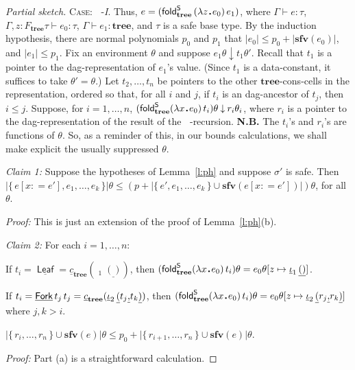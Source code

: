 \documentclass[envcountsame]{llncs}
\newcommand{\sfv}{\ensuremath{\mathbf{sfv}}}\newcommand{\ssize}[1]{\Vert #1\Vert}
\newcommand{\safe}[1]{#1^{\mathsf{S}}}
\newcommand{\folds}[1]{\mathop{\safe{\mathsf{fold}}_{#1}}}
\newcommand{\type}[1]{\ensuremath{\mathbf{#1}}\xspace}
\newcommand{\Tree}{\type{tree}}
\newcommand{\constr}[1]{\ensuremath{\mathop{\mathsf{#1}}\nolimits}\xspace}
\newcommand{\Leaf}{\constr{Leaf}}
\newcommand{\Fork}{\constr{Fork}}
\newcommand{\asize}[1]{\ensuremath{\mathopen{|}#1\mathclose{|}}\xspace}
\newcommand{\ustrut}{\rule[-.18\baselineskip]{0pt}{0pt}}
\newcommand{\upair}[2]{\underline{(}#1\underline{\ustrut,}#2\underline{)}}
\newcommand{\uiota}{\mathop{\underline{\iota}}\nolimits}
\newcommand{\uep}{\underline{()}}
\newcommand{\uc}{\underline{c}}
\renewcommand{\gets}{\ensuremath{\mathrel{\colon=}}\xspace}
\newcommand{\set}[1]{\{\,#1\,\}}
\newcommand{\entails}{\vdash}
\newcommand{\sqdot}{\rule{0.5mm}{0.5mm}}
\newcommand{\lam}[1]{\lambda #1\,\sqdot\,}
\newcommand{\yields}{\mathbin{\downarrow}}
\newcommand{\of}{\colon}
\renewcommand{\colon}{\mathpunct{:}}
\begin{document}
\begin{proof}[Partial sketch]
\textsc{Case:} $\folds{\Tree}$-\emph{I}.  
Thus, $e = (\folds{\Tree}\, (\lam{z}e_0) \, e_1)$, where 
$\Gamma\entails e\of\tau$, 
$\Gamma,z\of{F_{\Tree}\tau}\entails e_0\of{\tau}$, 
$\Gamma\entails e_1\of{\Tree}$, and $\tau$ is a safe base type.
By the induction hypothesis, there are normal polynomials $p_0$
and $p_1$ that $\asize{e_0}\leq p_0 + \asize{\sfv(e_0)}$, 
and $\asize{e_1}\leq p_1$.  Fix an environment $\theta$
and suppose $e_1\theta\yields t_1\theta'$.  Recall that
$t_1$ is a pointer to the dag-representation of $e_1$'s value.
(Since $t_1$ is a data-constant, it suffices to take $\theta'=\theta$.) 
Let $t_2,\dots,t_n$ be pointers to the other $\Tree$-cons-cells
in the representation, ordered so that, for all $i$ and $j$,
if $t_i$ is an dag-ancestor of $t_j$, then $i\leq j$. 
Suppose, for $i=1,\dots,n$, $(\folds{\Tree} (\lam{x}e_0)\,t_i)\theta\yields r_i\theta_i$, where $r_i$ is a pointer
to the dag-representation of the result of the $\folds\Tree$-recursion. \textbf{N.B.}  The $t_i$'s and $r_i$'s are functions
of $\theta$.  So, as a reminder of this, 
 in our bounds calculations, we shall make explicit
the usually suppressed $\theta$.


\smallskip\noindent\emph{Claim 1:} Suppose the 
hypotheses of Lemma~\ref{l:ph} and suppose $\sigma'$ is safe.
Then 
$\asize{\set{e[x\gets e'],e_1,\dots,e_k}}\theta\leq 
  (p+\asize{\set{e',e_1,\dots,e_k}\cup\sfv(e[x\gets e'])})\theta$,
  for all $\theta$.

\smallskip\noindent\emph{Proof:}
This is just an extension of the proof of Lemma~\ref{l:ph}(b).


\smallskip\noindent\emph{Claim 2:} For each $i=1,\dots,n$:
\begin{asparaenum}[(a)]
  \item If $t_i=\underline{\Leaf} = \uc_\Tree(\uiota_1\uep)$, 
  	then $(\folds{\Tree} (\lam{x}e_0)\,t_i)\theta 
	      = e_0\theta[z\mapsto \uiota_1\uep]$.
  \item If $t_i=\underline{\Fork}\,t_j\,t_j 
            = \uc_\Tree(\uiota_2\upair{t_j}{t_k})$, 
  	then $(\folds{\Tree} (\lam{x}e_0)\,t_i)\theta 
	      = e_0\theta[z\mapsto \uiota_2\upair{r_j}{r_k}]$
	      where $j,k>i$.
  \item $\asize{\set{r_i,\dots,r_n}\cup\sfv(e)}\theta
        \leq p_0 +\asize{\set{r_{i+1},\dots,r_n}\cup\sfv(e)}\theta$.
\end{asparaenum}

\smallskip\noindent\emph{Proof:}
Part (a) is a  straightforward calculation.  


\end{proof}
\end{document}
